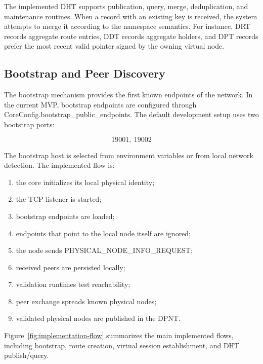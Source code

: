 \documentclass[12pt,a4paper]{article}
\newcommand{\codebreak}[1]{{\footnotesize\ttfamily #1}}
\begin{document}
The implemented DHT supports publication, query, merge, deduplication, and maintenance routines. When a record with an existing key is received, the system attempts to merge it according to the namespace semantics. For instance, DRT records aggregate route entries, DDT records aggregate holders, and DPT records prefer the most recent valid pointer signed by the owning virtual node.

\subsection{Bootstrap and Peer Discovery}
\label{sec:bootstrap-peer-discovery}

The bootstrap mechanism provides the first known endpoints of the network. In the current MVP, bootstrap endpoints are configured through \codebreak{CoreConfig.bootstrap\_\allowbreak{}public\_\allowbreak{}endpoints}. The default development setup uses two bootstrap ports:

\begin{equation}
    19001,\ 19002
\end{equation}

The bootstrap host is selected from environment variables or from local network detection. The implemented flow is:

\begin{enumerate}
    \item the core initializes its local physical identity;
    \item the TCP listener is started;
    \item bootstrap endpoints are loaded;
    \item endpoints that point to the local node itself are ignored;
    \item the node sends \codebreak{PHYSICAL\_\allowbreak{}NODE\_\allowbreak{}INFO\_\allowbreak{}REQUEST};
    \item received peers are persisted locally;
    \item validation runtimes test reachability;
    \item peer exchange spreads known physical nodes;
    \item validated physical nodes are published in the DPNT.
\end{enumerate}

Figure~\ref{fig:implementation-flow} summarizes the main implemented flows, including bootstrap, route creation, virtual session establishment, and DHT publish/query.
\end{document}
